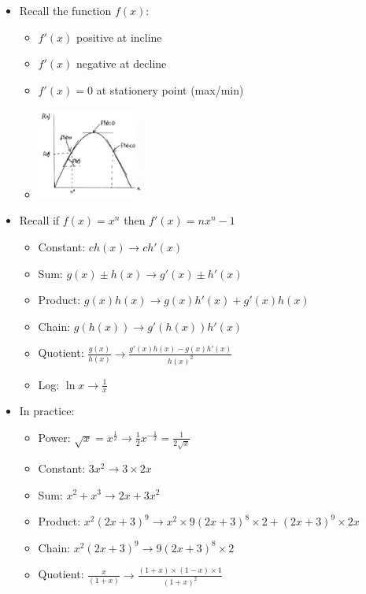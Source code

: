 \documentclass[11pt, english]{article}
\begin{document}
	\begin{itemize}                              
        \setlength\itemsep{0cm}
		\item Recall the function $f(x)$:
		\begin{itemize}
			\item $f'(x)$ positive at incline
			\item $f'(x)$ negative at decline
			\item $f'(x)=0$ at stationery point (max/min)
			\item \includegraphics[width=3.5cm,height=3cm]{EC315-IMG/15.png}
		\end{itemize}
		\item Recall if $f(x)=x^n$ then $f'(x)=nx^n-1$
		\begin{itemize}
			\item Constant: $ch(x)\longrightarrow ch'(x)$
			\item Sum: $g(x)\pm h(x)\longrightarrow g'(x)\pm h'(x)$
			\item Product: $g(x)h(x)\longrightarrow g(x)h'(x)+g'(x)h(x)$
			\item Chain: $g(h(x))\longrightarrow g'(h(x))h'(x)$
			\item Quotient: $\frac{g(x)}{h(x)}\longrightarrow\frac{g'(x)h(x)-g(x)h'(x)}{{h(x)}^2}$
			\item Log: $\ln x\longrightarrow\frac{1}{x}$
		\end{itemize}
		\item In practice:
		\begin{itemize}
			\item Power: $\sqrt{x}=x^{\frac{1}{2}}\longrightarrow\frac{1}{2}x^{-\frac{1}{2}}=\frac{1}{2\sqrt{x}}$
			\item Constant: $3x^2\longrightarrow3\times2x$
			\item Sum: $x^2+x^3\longrightarrow 2x+3x^2$
			\item Product: $x^2(2x+3)^9\longrightarrow x^2\times9(2x+3)^8\times2+(2x+3)^9\times2x$
			\item Chain: $x^2(2x+3)^9\longrightarrow9(2x+3)^8\times2$
			\item Quotient: $\frac{x}{(1+x)}\longrightarrow\frac{(1+x)\times(1-x)\times1}{(1+x)^2}$
		\end{itemize}
	\end{itemize}
\end{document}
